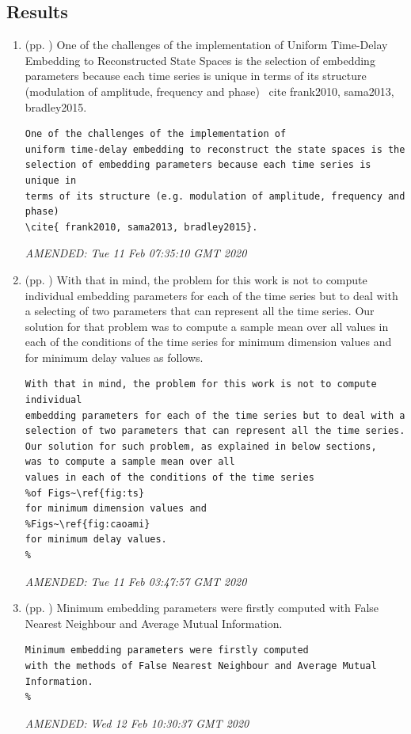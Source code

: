 \documentclass[10pt]{article}
\begin{document}
\subsection{Results}
\begin{enumerate}


\item  (pp. ) 
One of the challenges of the implementation of 
Uniform Time-Delay Embedding to Reconstructed State Spaces is the 
selection of embedding parameters because each time series is unique in 
terms of its structure (modulation of amplitude, frequency and phase) 
\ cite{ frank2010, sama2013, bradley2015}.

\begin{verbatim}
One of the challenges of the implementation of 
uniform time-delay embedding to reconstruct the state spaces is the 
selection of embedding parameters because each time series is unique in 
terms of its structure (e.g. modulation of amplitude, frequency and phase) 
\cite{ frank2010, sama2013, bradley2015}.
\end{verbatim}
	\textit{
	AMENDED: 
Tue 11 Feb 07:35:10 GMT 2020
	}
	\\



\item  (pp. ) 
With that in mind, the problem for this work is not to compute individual 
embedding parameters for each of the time series but to deal with a 
selecting of two parameters that can represent all the time series. 
Our solution for that problem was to compute a sample mean over all 
values in each of the conditions of the time series 
for minimum dimension values and 
for minimum delay values as follows.
\begin{verbatim}
With that in mind, the problem for this work is not to compute individual 
embedding parameters for each of the time series but to deal with a 
selection of two parameters that can represent all the time series. 
Our solution for such problem, as explained in below sections, 
was to compute a sample mean over all 
values in each of the conditions of the time series 
%of Figs~\ref{fig:ts}
for minimum dimension values and 
%Figs~\ref{fig:caoami} 
for minimum delay values.
%
\end{verbatim}
	\textit{
	AMENDED: 
Tue 11 Feb 03:47:57 GMT 2020
	}
	\\



\item  (pp. ) 
Minimum embedding parameters were firstly computed 
with False Nearest Neighbour and Average Mutual Information.
%
\begin{verbatim}
Minimum embedding parameters were firstly computed 
with the methods of False Nearest Neighbour and Average Mutual Information.
%
\end{verbatim}
	\textit{
	AMENDED: 
Wed 12 Feb 10:30:37 GMT 2020
	}
	\\


\end{enumerate}
\end{document}
